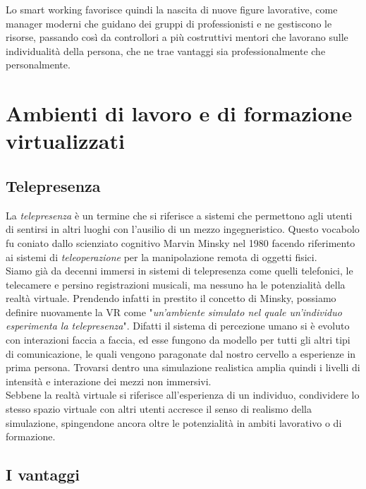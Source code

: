 Lo smart working favorisce quindi la nascita di nuove figure lavorative, come manager moderni che guidano dei gruppi di professionisti e ne gestiscono le risorse, passando così da controllori a più costruttivi mentori che lavorano sulle individualità della persona, che ne trae vantaggi sia professionalmente che personalmente. \\

\section{Ambienti di lavoro e di formazione virtualizzati}
\subsection{Telepresenza}
 La \textit{telepresenza} è un termine che si riferisce a sistemi che permettono agli utenti di sentirsi in altri luoghi con l'ausilio di un mezzo ingegneristico. Questo vocabolo fu coniato dallo scienziato cognitivo Marvin Minsky nel 1980 facendo riferimento ai sistemi di \textit{teleoperazione} per la manipolazione remota di oggetti fisici.\\
 Siamo già da decenni immersi in sistemi di telepresenza come quelli telefonici, le telecamere e persino registrazioni musicali, ma nessuno ha le potenzialità della realtà virtuale. Prendendo infatti in prestito il concetto di Minsky, possiamo definire nuovamente la VR come "\textit{un'ambiente simulato nel quale un'individuo esperimenta la telepresenza}"\cite{DVR}. Difatti il sistema di percezione umano si è evoluto con interazioni faccia a faccia, ed esse fungono da modello per tutti gli altri tipi di comunicazione, le quali vengono paragonate dal nostro cervello a esperienze in prima persona. Trovarsi dentro una simulazione realistica amplia quindi i livelli di intensità e interazione dei mezzi non immersivi. \\
 Sebbene la realtà virtuale si riferisce all'esperienza di un individuo, condividere lo stesso spazio virtuale con altri utenti accresce il senso di realismo della simulazione, spingendone ancora oltre le potenzialità in ambiti lavorativo o di formazione.  
 
 \subsection{I vantaggi}
 
